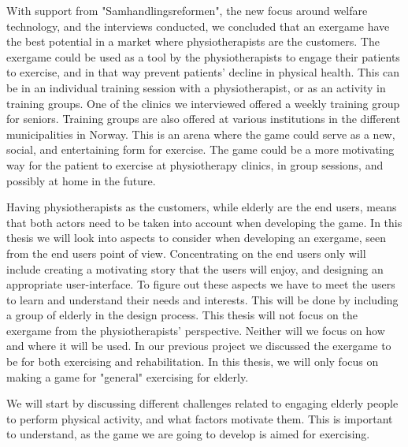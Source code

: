 With support from "Samhandlingsreformen", the new focus around welfare technology, and the interviews conducted, we concluded that an exergame have the best potential in a market where physiotherapists are the customers. The exergame could be used as a tool by the physiotherapists to engage their patients to exercise, and in that way prevent patients' decline in physical health. This can be in an individual training session with a physiotherapist, or as an activity in training groups. One of the clinics we interviewed offered a weekly training group for seniors. Training groups are also offered at various institutions in the different municipalities in Norway. This is an arena where the game could serve as a new, social, and entertaining form for exercise. The game could be a more motivating way for the patient to exercise at physiotherapy clinics, in group sessions, and possibly at home in the future. 

Having physiotherapists as the customers, while elderly are the end users, means that both actors need to be taken into account when developing the game. In this thesis we will look into aspects to consider when developing an exergame, seen from the end users point of view. Concentrating on the end users only will include creating a motivating story that the users will enjoy, and designing an appropriate user-interface. To figure out these aspects we have to meet the users to learn and understand their needs and interests. This will be done by including a group of elderly in the design process. This thesis will not focus on the exergame from the physiotherapists' perspective. Neither will we focus on how and where it will be used. In our previous project we discussed the exergame to be for both exercising and rehabilitation. In this thesis, we will only focus on making a game for "general" exercising for elderly. 

We will start by discussing different challenges related to engaging elderly people to perform physical activity, and what factors motivate them. This is important to understand, as the game we are going to develop is aimed for exercising.
